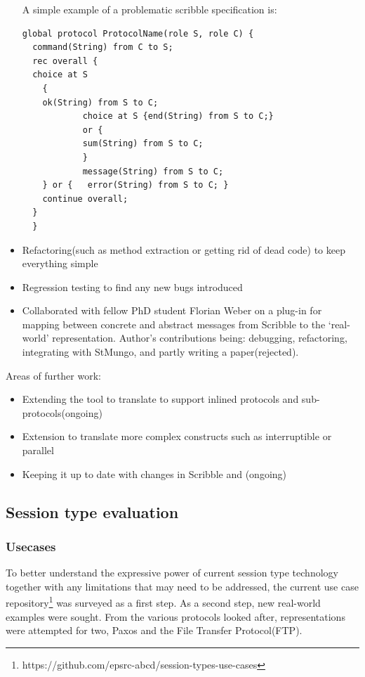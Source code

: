 \begin{itemize}
A simple example of a problematic scribble specification is:
\begin{lstlisting}[basicstyle=\footnotesize]
global protocol ProtocolName(role S, role C) {
  command(String) from C to S;
  rec overall {
  choice at S
  	{
  	ok(String) from S to C;
  			choice at S {end(String) from S to C;}
  			or {
  			sum(String) from S to C;
  			}
  			message(String) from S to C;
  	} or {	 error(String) from S to C;	}
  	continue overall;
  }
  }
\end{lstlisting}
\item Refactoring(such as method extraction or getting rid of dead code) to keep everything simple
\item Regression testing to find any new bugs introduced
\item Collaborated with fellow PhD student Florian Weber on a plug-in for mapping between concrete and abstract messages from Scribble to the `real-world' representation. Author's contributions being: debugging, refactoring, integrating with StMungo, and partly writing a paper(rejected).
\end{itemize}

Areas of further work:
\begin{itemize}
\item Extending the tool to translate to support inlined protocols and sub-protocols(ongoing)
\item Extension to translate more complex constructs such as interruptible or parallel
\item Keeping it up to date with changes in Scribble and \Mungo(ongoing)
\end{itemize}

\subsection{Session type evaluation}
\label{sub:eval}
\subsubsection{Usecases}
\label{sub:usecases}

To better understand the expressive power of current session type technology together with any limitations that may need to be addressed, the current use case repository\footnote{https://github.com/epsrc-abcd/session-types-use-cases} was surveyed as a first step. As a second step, new real-world examples were sought. From the various protocols looked after, representations were attempted for two, Paxos and the File Transfer Protocol(FTP).

